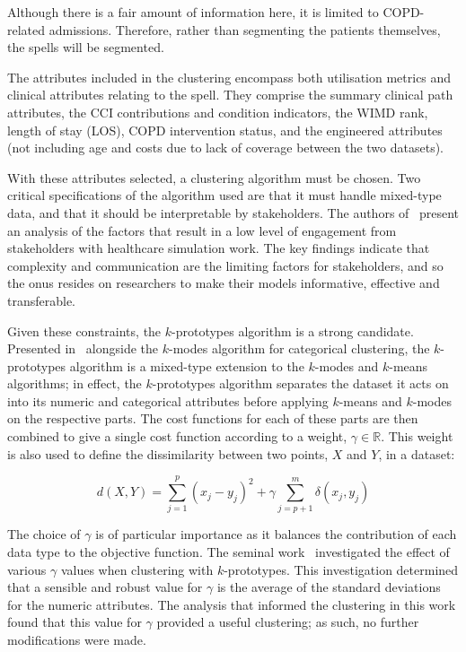 \documentclass[]{interact}
\theoremstyle{plain}%
\theoremstyle{definition}
\theoremstyle{remark}
\begin{document}
Although there is a fair amount of information here, it is limited to
COPD-related admissions. Therefore, rather than segmenting the patients
themselves, the spells will be segmented. 

The attributes included in the clustering encompass both utilisation metrics and
clinical attributes relating to the spell. They comprise the summary clinical
path attributes, the CCI contributions and condition indicators, the WIMD rank,
length of stay (LOS), COPD intervention status, and the engineered attributes
(not including age and costs due to lack of coverage between the two datasets).

With these attributes selected, a clustering algorithm must be chosen. Two
critical specifications of the algorithm used are that it must handle mixed-type
data, and that it should be interpretable by stakeholders. The authors
of~\cite{Jahangirian2015} present an analysis of the factors that result in a
low level of engagement from stakeholders with healthcare simulation work. The
key findings indicate that complexity and communication are the limiting factors
for stakeholders, and so the onus resides on researchers to make their models
informative, effective and transferable.

Given these constraints, the \(k\)-prototypes algorithm is a strong candidate.
Presented in~\cite{Huang1997a} alongside the \(k\)-modes algorithm for
categorical clustering, the \(k\)-prototypes algorithm is a mixed-type
extension to the \(k\)-modes and \(k\)-means algorithms; in effect, the
\(k\)-prototypes algorithm separates the dataset it acts on into its numeric and
categorical attributes before applying \(k\)-means and \(k\)-modes on the
respective parts. The cost functions for each of these parts are then combined
to give a single cost function according to a weight, \(\gamma \in \mathbb R\).
This weight is also used to define the dissimilarity between two points, \(X\)
and \(Y\), in a dataset:

\begin{equation}\label{eq:kprototypes}
    d(X, Y) = \sum_{j=1}^{p} \left(x_j - y_j\right)^2 + \gamma \sum_{j=p+1}^{m}
    \delta \left(x_j, y_j\right)
\end{equation}

The choice of \(\gamma\) is of particular importance as it balances the
contribution of each data type to the objective function. The seminal
work~\cite{Huang1997a} investigated the effect of various \(\gamma\) values
when clustering with \(k\)-prototypes. This investigation determined that a
sensible and robust value for \(\gamma\) is the average of the standard
deviations for the numeric attributes. The analysis that informed the clustering
in this work found that this value for \(\gamma\) provided a useful
clustering; as such, no further modifications were made.
\end{document}

